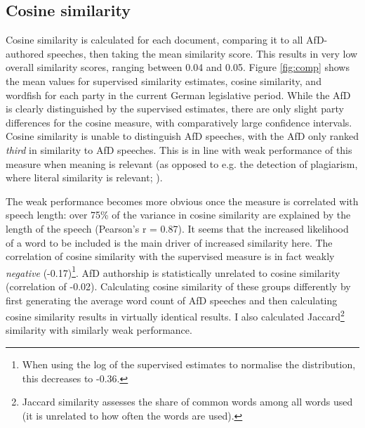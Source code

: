 \documentclass{article}
\begin{document}
\subsection{Cosine similarity}

Cosine similarity is calculated for each document, comparing it to all AfD-authored speeches, then taking the mean similarity score. This results in very low overall similarity scores, ranging between 0.04 and 0.05. Figure \ref{fig:comp} shows the mean values for supervised similarity estimates, cosine similarity, and wordfish for each party in the current German legislative period. While the AfD is clearly distinguished by the supervised estimates, there are only slight party differences for the cosine measure, with comparatively large confidence intervals. Cosine similarity is unable to distinguish AfD speeches, with the AfD only ranked \textit{third} in similarity to AfD speeches. This is in line with weak performance of this measure when meaning is relevant (as opposed to e.g. the detection of plagiarism, where literal similarity is relevant; \cite{Prasetya2018}).\par

The weak performance becomes more obvious once the measure is correlated with speech length: over 75\% of the variance in cosine similarity are explained by the length of the speech (Pearson's r = 0.87). It seems that the increased likelihood of a word to be included is the main driver of increased similarity here. The correlation of cosine similarity with the supervised measure is in fact weakly \textit{negative} (-0.17)\footnote{When using the log of the supervised estimates to normalise the distribution, this decreases to -0.36.}. AfD authorship is statistically unrelated to cosine similarity (correlation of -0.02). Calculating cosine similarity of these groups differently by first generating the average word count of AfD speeches and then calculating cosine similarity results in virtually identical results. I also calculated Jaccard\footnote{Jaccard similarity assesses the share of common words among all words used (it is unrelated to how often the words are used).} similarity with similarly weak performance.\par
\end{document}
